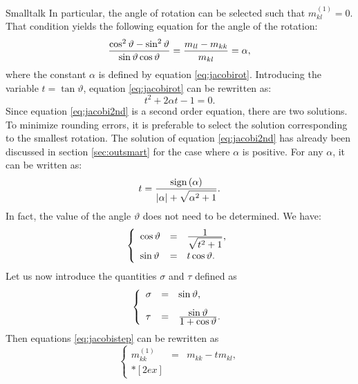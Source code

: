 \begin{displaycode}{Smalltalk}
In particular, the angle of rotation can be selected such that
$m^{\left(1\right)}_{kl}=0$. That condition yields the following
equation for the angle of the rotation:
\begin{equation}
\label{eq:jacobirot}
  {\cos^2\vartheta-\sin^2\vartheta
  \over\sin\vartheta\cos\vartheta}={m_{ll} - m_{kk}\over
  m_{kl}}=\alpha,
\end{equation}
where the constant $\alpha$ is defined by equation
\ref{eq:jacobirot}. Introducing the variable $t=\tan\vartheta$,
equation \ref{eq:jacobirot} can be rewritten as:
\begin{equation}
\label{eq:jacobi2nd}
  t^2+2\alpha t - 1 =0.
\end{equation}
Since equation \ref{eq:jacobi2nd} is a second order equation,
there are two solutions. To minimize rounding errors, it is
preferable to select the solution corresponding to the smallest
rotation\cite{Press}. The solution of equation \ref{eq:jacobi2nd}
has already been discussed in section \ref{sec:outsmart} for the
case where $\alpha$ is positive. For any $\alpha$, it can be
written as:
\begin{equation}
\label{eq:jacobisolinverse}
  t={\displaystyle\mathop{\textrm{sign}}\left(\alpha\right)\over\displaystyle\left|\alpha\right|+\sqrt{\alpha^2+1}}.
\end{equation}
In fact, the value of the angle $\vartheta$ does not need to be
determined. We have:
\begin{equation}
  \left\{
  \begin{array}{lcl}
    \cos\vartheta&=&{\displaystyle 1\over\displaystyle
    \sqrt{t^2+1}},\\*[2ex]
    \sin\vartheta&=&t\cos\vartheta. \end{array}
  \right.
\end{equation}
Let us now introduce the quantities $\sigma$ and $\tau$ defined as
\begin{equation}
  \left\{
  \begin{array}{lcl}
    \sigma&=&\sin\vartheta,\\*[2ex]
    \tau&=&{\displaystyle\sin\vartheta \over\displaystyle 1+\cos\vartheta}.\end{array}
  \right.
\end{equation}
Then equations \ref{eq:jacobistep} can be rewritten as
\begin{equation}
\label{eq:jacobistepfinal}
  \left\{
  \begin{array}{lcl}
    m^{\left(1\right)}_{kk} &=& m_{kk} - t m_{kl}, \\*[2ex]

\end{array}
\end{equation}
\end{displaycode}
